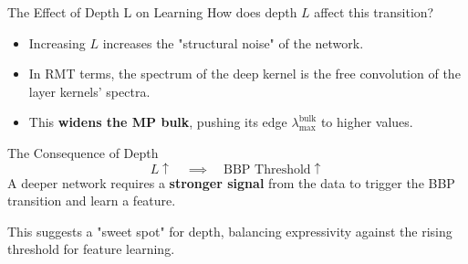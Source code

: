 \documentclass{beamer}
\begin{document}
\begin{frame}{The Effect of Depth L on Learning}
How does depth $L$ affect this transition?
\begin{itemize}
    \item Increasing $L$ increases the "structural noise" of the network.
    \item In RMT terms, the spectrum of the deep kernel is the free convolution of the layer kernels' spectra.
    \item This \textbf{widens the MP bulk}, pushing its edge $\lambda_{\max}^{\text{bulk}}$ to higher values.
\end{itemize}
\begin{alertblock}{The Consequence of Depth}
\[ L \uparrow \quad \implies \quad \text{BBP Threshold} \uparrow \]
A deeper network requires a \textbf{stronger signal} from the data to trigger the BBP transition and learn a feature.
\end{alertblock}
This suggests a "sweet spot" for depth, balancing expressivity against the rising threshold for feature learning.
\end{frame}
\end{document}
